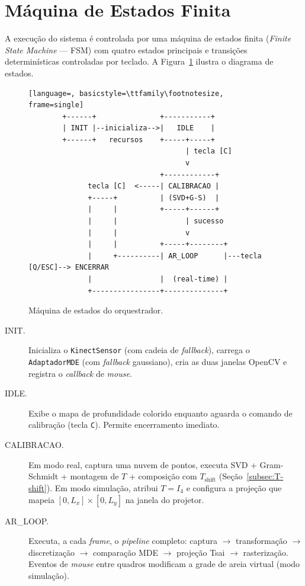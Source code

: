 \section{Máquina de Estados Finita}
\label{sec:fsm}

A execução do sistema é controlada por uma máquina de estados finita
(\textit{Finite State Machine} — FSM) com quatro estados principais e
transições determinísticas controladas por teclado. A
Figura~\ref{fig:fsm} ilustra o diagrama de estados.

\begin{figure}[!ht]
\centering
\begin{lstlisting}[language=, basicstyle=\ttfamily\footnotesize, frame=single]
        +------+               +-----------+
        | INIT |--inicializa-->|   IDLE    |
        +------+   recursos    +-----+-----+
                                     | tecla [C]
                                     v
                               +------------+
              tecla [C]  <-----| CALIBRACAO |
              +-----+          | (SVD+G-S)  |
              |     |          +-----+------+
              |     |                | sucesso
              |     |                v
              |     |          +-----+--------+
              |     +----------| AR_LOOP      |---tecla [Q/ESC]--> ENCERRAR
              |                |  (real-time) |
              +----------------+--------------+
\end{lstlisting}
\caption{Máquina de estados do orquestrador.}
\label{fig:fsm}
\end{figure}

\begin{description}
    \item[INIT.] Inicializa o \texttt{KinectSensor} (com cadeia de
          \emph{fallback}), carrega o \texttt{AdaptadorMDE} (com
          \emph{fallback} gaussiano), cria as duas janelas OpenCV e
          registra o \emph{callback} de \emph{mouse}.
    \item[IDLE.] Exibe o mapa de profundidade colorido enquanto aguarda
          o comando de calibração (tecla \texttt{C}). Permite
          encerramento imediato.
    \item[CALIBRACAO.] Em modo real, captura uma nuvem de pontos,
          executa SVD + Gram-Schmidt + montagem de $T$ + composição com
          $T_{\text{shift}}$ (Seção~\ref{subsec:T-shift}). Em modo
          simulação, atribui $T = I_4$ e configura a projeção que mapeia
          $[0, L_x] \times [0, L_y]$ na janela do projetor.
    \item[AR\_LOOP.] Executa, a cada \emph{frame}, o \textit{pipeline}
          completo: captura $\to$ transformação $\to$ discretização
          $\to$ comparação MDE $\to$ projeção Tsai $\to$ rasterização.
          Eventos de \emph{mouse} entre quadros modificam a grade de
          areia virtual (modo simulação).
\end{description}

